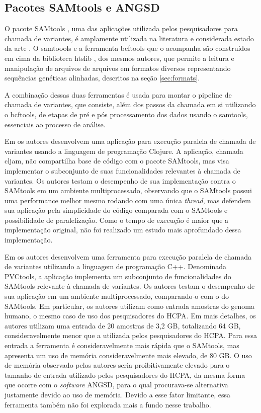 \documentclass[cic,tc]{iiufrgs}
\begin{document}
\subsection{Pacotes SAMtools e ANGSD}

O pacote SAMtools \cite{li2009sequence}, uma das aplicações utilizada pelos
pesquisadores para chamada de variantes, é amplamente utilizada na literatura
\cite{danecek2021twelve} e considerada estado da arte \cite{yao2020evaluation}.
O samtoools e a ferramenta bcftools que o acompanha são construídos em cima da
biblioteca htslib \cite{bonfield2021htslib}, dos mesmos autores, que permite a
leitura e manipulação de arquivos de arquivos em formatos diversos
representando sequências genéticas alinhadas, descritos na seção
\ref{sec:formats}.

A combinação dessas duas ferramentas é usada para montar o pipeline de chamada
de variantes, que consiste, além dos passos da chamada em si utilizando o
bcftools, de etapas de pré e pós processamento dos dados usando o samtools,
essenciais ao processo de análise.

Em \cite{takeuchi2016cljam} os autores desenvolvem uma aplicação para execução
paralela de chamada de variantes usando a linguagem de programação Clojure. A
aplicação, chamada cljam, não compartilha base de código com o pacote SAMtools,
mas visa implementar o subconjunto de suas funcionalidades relevantes à
chamada de variantes. Os autores testam o desempenho de sua implementação
contra o SAMtools em um ambiente multiprocessado, observando que o SAMtools
possui uma performance melhor mesmo rodando com uma única \textit{thread}, mas defendem
sua aplicação pela simplicidade do código comparada com o SAMtools e
possibilidade de paralelização. Como o tempo de execução é maior que a
implementação original, não foi realizado um estudo mais aprofundado dessa
implementação.

Em \cite{jin2019pvctools} os autores desenvolvem uma ferramenta para execução
paralela de chamada de variantes utilizando a linguagem de programação C++.
Denominada PVCtools, a aplicação implementa um subconjunto de funcionalidades
do SAMtools relevante à chamada de variantes. Os autores testam o desempenho de
sua aplicação em um ambiente multiprocessado, comparando-o com o do SAMtools.
Em particular, os autores utilizam como entrada amostras do genoma humano,
o mesmo caso de uso dos pesquisadores do HCPA. Em mais detalhes, os
autores utilizam uma entrada de 20 amostras de 3,2 GB, totalizando 64 GB,
consideravelmente menor que a utilizada pelos pesquisadores do HCPA. Para essa
entrada a ferramenta é consideravelmente mais rápida que o SAMtools, mas
apresenta um uso de memória consideravelmente mais elevado, de 80 GB. O uso de
memória observado pelos autores seria proibitivamente elevado para o tamanho de
entrada utilizado pelos pesquisadores do HCPA, da mesma forma que ocorre com o
\textit{software} ANGSD, para o qual procurava-se alternativa justamente devido ao uso
de memória. Devido a esse fator limitante, essa ferramenta também não foi
explorada mais a fundo nesse trabalho.
\end{document}
